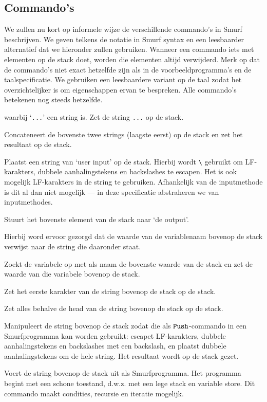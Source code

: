\subsection{Commando's}
\label{sec:intro:commands}
We zullen nu kort op informele wijze de verschillende commando's in Smurf
beschrijven. We geven telkens de notatie in Smurf syntax en een leesbaarder
alternatief dat we hieronder zullen gebruiken. Wanneer een commando iets met
elementen op de stack doet, worden die elementen altijd verwijderd.
Merk op dat de commando's niet exact hetzelfde zijn als in de
voorbeeldprogramma's en de taalspecificatie. We gebruiken een leesbaardere
variant op de taal zodat het overzichtelijker is om eigenschappen ervan te
bespreken. Alle commando's betekenen nog steeds hetzelfde.

\begin{description}[style=nextline,font=\normalfont]
	\item[\smurfinline{"..."} of $\StmPush~\texttt{...}$]
		waarbij `\texttt{...}' een string is. Zet de string \texttt{...} op de
		stack.
	\item[\smurfinline{+} of $\StmCat$]
		Concateneert de bovenste twee strings (laagste eerst) op de stack en zet
		het resultaat op de stack.
	\item[\smurfinline{i} of $\StmInput$]
		Plaatst een string van `user input' op de stack. Hierbij wordt
		\texttt{\textbackslash} gebruikt om LF-karakters, dubbele aanhalingstekens
		en backslashes te escapen. Het is ook mogelijk LF-karakters in de string te
		gebruiken. Afhankelijk van de inputmethode is dit al dan niet mogelijk ---
		in deze specificatie abstraheren we van inputmethodes.
	\item[\smurfinline{o} of $\StmOutput$]
		Stuurt het bovenste element van de stack naar `de output'.
	\item[\smurfinline{p} of $\StmPut$]
		Hierbij word ervoor gezorgd dat de waarde van de variablenaam bovenop de
		stack verwijst naar de string die daaronder staat.
    \item[\smurfinline{g} of $\StmGet$]
		Zoekt de variabele op met als naam de bovenste waarde van de stack en zet de waarde van die variabele bovenop de stack.
	\item[\smurfinline{h} of $\StmHead$]
		Zet het eerste karakter van de string bovenop de stack op de
		stack.
	\item[\smurfinline{t} of $\StmTail$]
		Zet alles behalve de head van de string bovenop de stack op de stack.
	\item[\smurfinline{q} of $\StmQuotify$]
		Manipuleert de string bovenop de stack zodat die als $\texttt{Push}$-commando in
		een Smurfprogramma kan worden gebruikt: escapet LF-karakters, dubbele
		aanhalingstekens en back\-slashes met een backslash, en plaatst dubbele
		aanhalingstekens om de hele string. Het resultaat wordt op de stack gezet.
	\item[\smurfinline{x} of $\StmExec$]
		Voert de string bovenop de stack uit als Smurfprogramma. Het programma
		begint met een schone toestand, d.w.z. met een lege stack en variable
		store. Dit commando maakt condities, recursie en iteratie mogelijk.
\end{description}

